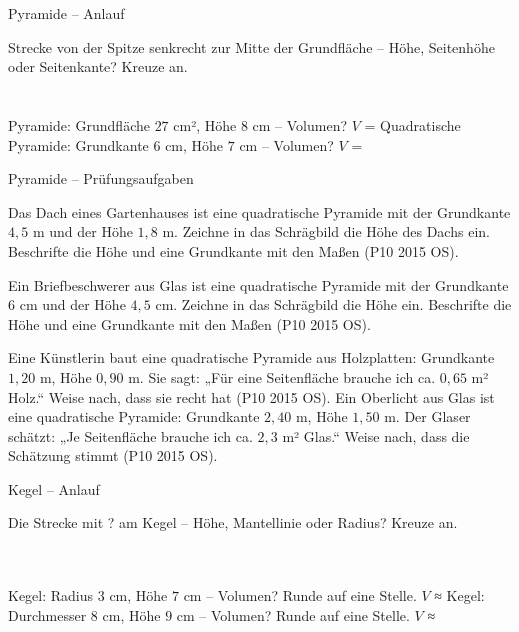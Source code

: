 \setcounter{aufgabe}{20}

\begin{aufgabe}{Pyramide – Anlauf}
\begin{teile}
\teil Strecke von der Spitze senkrecht zur Mitte der Grundfläche – Höhe, Seitenhöhe oder Seitenkante? Kreuze an.\\ \\ \\ 
\teil Pyramide: Grundfläche $27$ cm², Höhe $8$ cm – Volumen? $V$ = \leerfeld[cm³]
\teil Quadratische Pyramide: Grundkante $6$ cm, Höhe $7$ cm – Volumen? $V$ = \leerfeld[cm³]
\end{teile}
\end{aufgabe}

\begin{aufgabe}{Pyramide – Prüfungsaufgaben}
\begin{teile}
\teil Das Dach eines Gartenhauses ist eine quadratische Pyramide mit der Grundkante $4{,}5$ m und der Höhe $1{,}8$ m. Zeichne in das Schrägbild die Höhe des Dachs ein. Beschrifte die Höhe und eine Grundkante mit den Maßen \hfill (P10 2015 OS).

\teil Ein Briefbeschwerer aus Glas ist eine quadratische Pyramide mit der Grundkante $6$ cm und der Höhe $4{,}5$ cm. Zeichne in das Schrägbild die Höhe ein. Beschrifte die Höhe und eine Grundkante mit den Maßen \hfill (P10 2015 OS).

\teil Eine Künstlerin baut eine quadratische Pyramide aus Holzplatten: Grundkante $1{,}20$ m, Höhe $0{,}90$ m. Sie sagt: „Für eine Seitenfläche brauche ich ca. $0{,}65$ m² Holz.“ Weise nach, dass sie recht hat \hfill (P10 2015 OS).
\teil Ein Oberlicht aus Glas ist eine quadratische Pyramide: Grundkante $2{,}40$ m, Höhe $1{,}50$ m. Der Glaser schätzt: „Je Seitenfläche brauche ich ca. $2{,}3$ m² Glas.“ Weise nach, dass die Schätzung stimmt \hfill (P10 2015 OS).
\end{teile}
\end{aufgabe}

\begin{aufgabe}{Kegel – Anlauf}
\begin{teile}
\teil Die Strecke mit ? am Kegel – Höhe, Mantellinie oder Radius? Kreuze an.\\ \\ \\ 

\teil Kegel: Radius $3$ cm, Höhe $7$ cm – Volumen? Runde auf eine Stelle. $V$ ≈ \leerfeld[cm³]
\teil Kegel: Durchmesser $8$ cm, Höhe $9$ cm – Volumen? Runde auf eine Stelle. $V$ ≈ \leerfeld[cm³]
\end{teile}
\end{aufgabe}

